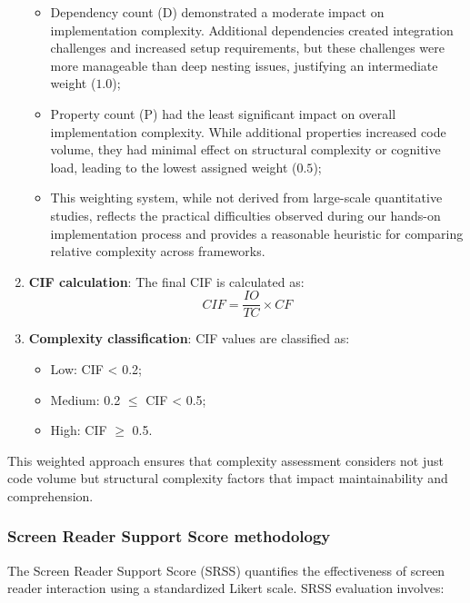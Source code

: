 \begin{enumerate}
    \begin{itemize}
        \item Dependency count (D) demonstrated a moderate impact on implementation complexity. Additional dependencies created integration challenges and increased setup requirements, but these challenges were more manageable than deep nesting issues, justifying an intermediate weight ($1.0$);

        \item Property count (P) had the least significant impact on overall implementation complexity. While additional properties increased code volume, they had minimal effect on structural complexity or cognitive load, leading to the lowest assigned weight ($0.5$);

        \item This weighting system, while not derived from large-scale quantitative studies, reflects the practical difficulties observed during our hands-on implementation process and provides a reasonable heuristic for comparing relative complexity across frameworks.
    \end{itemize}

    \item \textbf{CIF calculation}: The final CIF is calculated as:
    \begin{equation}
    CIF = \frac{IO}{TC} \times CF
    \end{equation}
    
    \item \textbf{Complexity classification}: CIF values are classified as:
    \begin{itemize}
        \item Low: CIF < 0.2;
        \item Medium: 0.2 $\leq$ CIF < 0.5;
        \item High: CIF $\geq$ 0.5.
    \end{itemize}
\end{enumerate}

This weighted approach ensures that complexity assessment considers not just code volume but structural complexity factors that impact maintainability and comprehension.

\subsubsection{Screen Reader Support Score methodology}
\label{subsubsec:srss-methodology}

The Screen Reader Support Score (SRSS) quantifies the effectiveness of screen reader interaction using a standardized Likert scale. SRSS evaluation involves:

